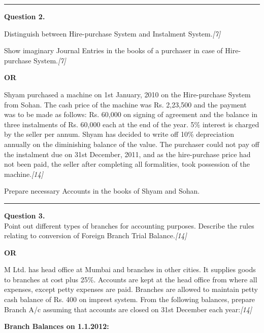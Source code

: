 \documentclass[11pt,a4paper]{article}
\newcommand{\pts}[1]{\hfill   \textit{[#1]}}
\begin{document}
\medskip\rule{\linewidth}{0.2pt}




\noindent   \textbf{Question 2.} \\

\begin{parts}
  \item Distinguish between Hire-purchase System and Instalment System.\pts{7}
  \item Show imaginary Journal Entries in the books of a purchaser in case of Hire-purchase System.\pts{7}
\end{parts}

\centerline{   \textbf{OR}}

Shyam purchased a machine on 1st January, 2010 on the Hire-purchase System from Sohan. The cash price of the machine was Rs. 2,23,500 and the payment was to be made as follows: Rs. 60,000 on signing of agreement and the balance in three instalments of Rs. 60,000 each at the end of the year. 5\% interest is charged by the seller per annum. Shyam has decided to write off 10\% depreciation annually on the diminishing balance of the value. The purchaser could not pay off the instalment due on 31st December, 2011, and as the hire-purchase price had not been paid, the seller after completing all formalities, took possession of the machine.\pts{14}

Prepare necessary Accounts in the books of Shyam and Sohan.

\medskip\rule{\linewidth}{0.2pt}




\noindent   \textbf{Question 3.} \\
Point out different types of branches for accounting purposes. Describe the rules relating to conversion of Foreign Branch Trial Balance.\pts{14}

\centerline{   \textbf{OR}}

M Ltd. has head office at Mumbai and branches in other cities. It supplies goods to branches at cost plus 25\%. Accounts are kept at the head office from where all expenses, except petty expenses are paid. Branches are allowed to maintain petty cash balance of Rs. 400 on imprest system. From the following balances, prepare Branch A/c assuming that accounts are closed on 31st December each year:\pts{14}

   \textbf{Branch Balances on 1.1.2012:}
\end{document}
